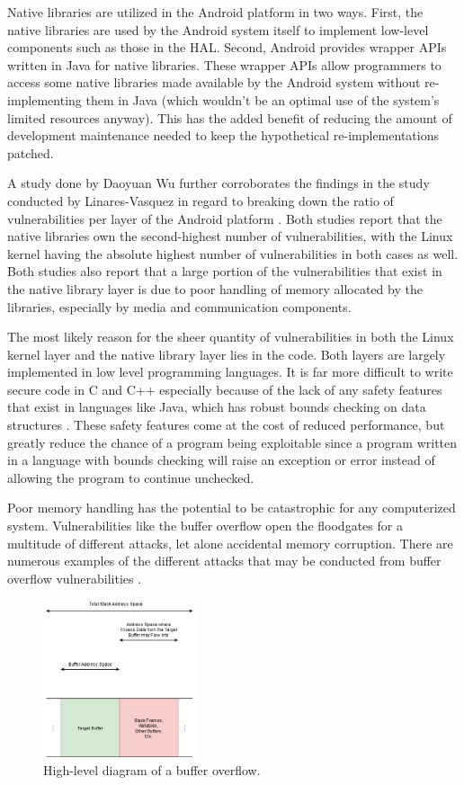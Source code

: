 Native libraries are utilized in the Android platform in two ways.
First, the native libraries are used by the Android system itself to implement low-level components such as those in the HAL.
Second, Android provides wrapper APIs written in Java for native libraries.
These wrapper APIs allow programmers to access some native libraries made available by the Android system without re-implementing them in Java (which wouldn't be an optimal use of the system's limited resources anyway).
This has the added benefit of reducing the amount of development maintenance needed to keep the hypothetical re-implementations patched.

A study done by Daoyuan Wu \etal further corroborates the findings in the study conducted by Linares-Vasquez \etal in regard to breaking down the ratio of vulnerabilities per layer of the Android platform \cite{LinaresVasquez2017, Wu2019}.
Both studies report that the native libraries own the second-highest number of vulnerabilities, with the Linux kernel having the absolute highest number of vulnerabilities in both cases as well.
Both studies also report that a large portion of the vulnerabilities that exist in the native library layer is due to poor handling of memory allocated by the libraries, especially by media and communication components.

The most likely reason for the sheer quantity of vulnerabilities in both the Linux kernel layer and the native library layer lies in the code.
Both layers are largely implemented in low level programming languages.
It is far more difficult to write secure code in C and C++ especially because of the lack of any safety features that exist in languages like Java, which has robust bounds checking on data structures \cite{JavaDocs2022}.
These safety features come at the cost of reduced performance, but greatly reduce the chance of a program being exploitable since a program written in a language with bounds checking will raise an exception or error instead of allowing the program to continue unchecked.

Poor memory handling has the potential to be catastrophic for any computerized system.
Vulnerabilities like the buffer overflow open the floodgates for a multitude of different attacks, let alone accidental memory corruption.
There are numerous examples of the different attacks that may be conducted from buffer overflow vulnerabilities \cite{Lhee2003, Kuperman2005}.

\begin{figure}[htbp]
    \centerline{\includegraphics[width=0.4\textwidth]{figures/BufferOverflow.png}}
    \caption{High-level diagram of a buffer overflow.}
    \label{fig:BufferOverflow}
\end{figure}

